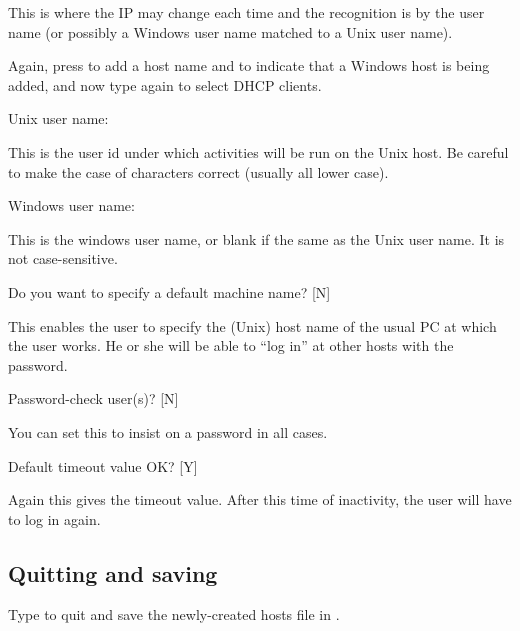 This is where the IP may change each time and the recognition is by the
user name (or possibly a Windows user name matched to a Unix user
name).

Again, press  to add a host name and
 to indicate that a Windows host is being added,
and now type  again to select DHCP clients.

\begin{expara}

Unix user name:

\end{expara}

This is the user id under which activities will be run on the Unix host.
Be careful to make the case of characters correct (usually all lower
case).

\begin{expara}

Windows user name:

\end{expara}

This is the windows user name, or blank if the same as the Unix user
name. It is not case-sensitive.

\begin{expara}

Do you want to specify a default machine name? [N]

\end{expara}

This enables the user to specify the (Unix) host name of the usual PC at
which the user works. He or she will be able to ``log in'' at other hosts with the password.

\begin{expara}

Password-check user(s)? [N]

\end{expara}

You can set this to insist on a password in all cases.

\begin{expara}

Default timeout value OK? [Y]

\end{expara}

Again this gives the timeout value. After this time of inactivity, the
user will have to log in again.

\subsection{Quitting and saving}
Type  to quit and save the newly-created hosts file in \hostsfile{}.


